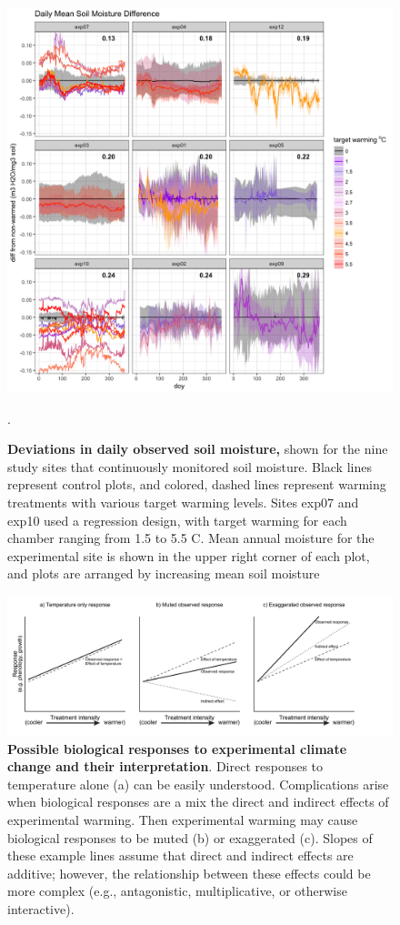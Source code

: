 \documentclass{article}
\begin{document}
 \begin{figure}[h]
    \centering
 \includegraphics{../Analyses/figures/Exploratory_TimeSeries_SoilMoist_Deviation.png}  
 \caption{\textbf{Deviations in daily observed soil moisture,} shown for the nine  study sites that continuously monitored soil moisture. Black lines represent control plots, and colored, dashed lines represent warming treatments with various target warming levels. Sites exp07 and exp10 used a regression design, with target warming for each chamber ranging from 1.5 to 5.5 \degree C. Mean annual moisture for the experimental site is shown in the upper right corner of each plot, and plots are arranged by increasing mean soil moisture}. %
 \label{fig:mois}
 \end{figure}
 \begin{figure}[h]
 \includegraphics{../Analyses/figures/DirIndWarmingEffects.pdf} 
 \caption{\textbf{Possible biological responses to experimental climate change and their interpretation}. Direct responses to temperature alone (a) can be easily understood. Complications arise when biological responses are a mix the direct and indirect effects of experimental warming. Then experimental warming may cause biological responses to be muted (b) or exaggerated (c). Slopes of these example lines assume that direct and indirect effects are additive; however, the relationship between these effects could be more complex (e.g., antagonistic, multiplicative, or otherwise interactive).} 
\label{fig:biolimp}
  \end{figure}
\end{document}
